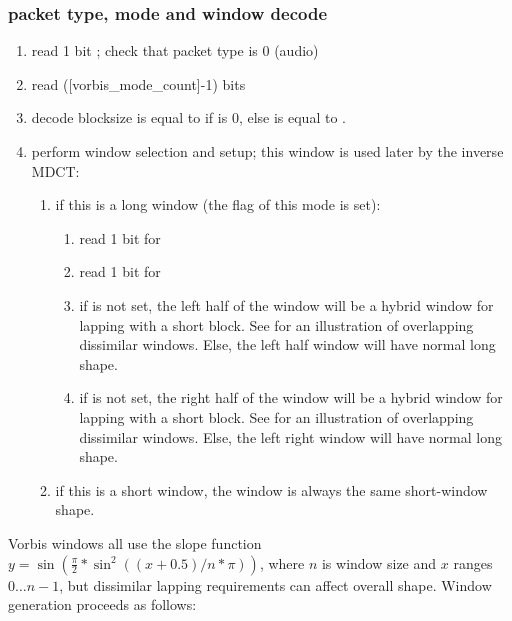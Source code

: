 \subsubsection{packet type, mode and window decode}

\begin{enumerate}
 \item read 1 bit ; check that packet type is 0 (audio)
 \item read ([vorbis_mode_count]-1) bits
 \item decode blocksize \varname{[n]} is equal to \varname{[blocksize_0]} if
 is 0, else \varname{[n]} is equal to \varname{[blocksize_1]}.
 \item perform window selection and setup; this window is used later by the inverse MDCT:
  \begin{enumerate}
   \item if this is a long window (the  flag of this mode is
set):
    \begin{enumerate}
     \item read 1 bit for 
     \item read 1 bit for 
     \item if  is not set, the left half
         of the window will be a hybrid window for lapping with a
         short block.  See  for an illustration of overlapping
dissimilar
         windows. Else, the left half window will have normal long
         shape.
     \item if  is not set, the right half of
         the window will be a hybrid window for lapping with a short
         block.  See  for an
illustration of overlapping dissimilar
         windows. Else, the left right window will have normal long
         shape.
    \end{enumerate}

   \item  if this is a short window, the window is always the same
       short-window shape.
  \end{enumerate}

\end{enumerate}

Vorbis windows all use the slope function $y=\sin(\frac{\pi}{2} * \sin^2((x+0.5)/n * \pi))$,
where $n$ is window size and $x$ ranges $0 \ldots n-1$, but dissimilar
lapping requirements can affect overall shape.  Window generation
proceeds as follows:

